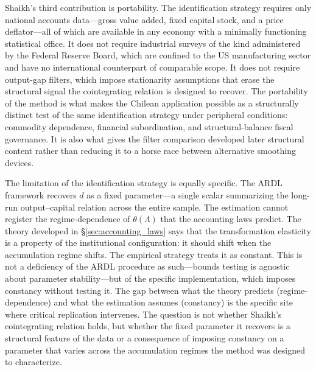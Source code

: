 Shaikh's third contribution is portability. The identification strategy requires only national accounts data---gross value added, fixed capital stock, and a price deflator---all of which are available in any economy with a minimally functioning statistical office. It does not require industrial surveys of the kind administered by the Federal Reserve Board, which are confined to the US manufacturing sector and have no international counterpart of comparable scope. It does not require output-gap filters, which impose stationarity assumptions that erase the structural signal the cointegrating relation is designed to recover. The portability of the method is what makes the Chilean application possible as a structurally distinct test of the same identification strategy under peripheral conditions: commodity dependence, financial subordination, and structural-balance fiscal governance. It is also what gives the filter comparison developed later structural content rather than reducing it to a horse race between alternative smoothing devices.

The limitation of the identification strategy is equally specific. The ARDL framework recovers $d$ as a fixed parameter---a single scalar summarizing the long-run output--capital relation across the entire sample. The estimation cannot register the regime-dependence of $\theta(\Lambda)$ that the accounting laws predict. The theory developed in \S\ref{sec:accounting_laws} says that the transformation elasticity is a property of the institutional configuration: it should shift when the accumulation regime shifts. The empirical strategy treats it as constant. This is not a deficiency of the ARDL procedure as such---bounds testing is agnostic about parameter stability---but of the specific implementation, which imposes constancy without testing it. The gap between what the theory predicts (regime-dependence) and what the estimation assumes (constancy) is the specific site where critical replication intervenes. The question is not whether Shaikh's cointegrating relation holds, but whether the fixed parameter it recovers is a structural feature of the data or a consequence of imposing constancy on a parameter that varies across the accumulation regimes the method was designed to characterize.



